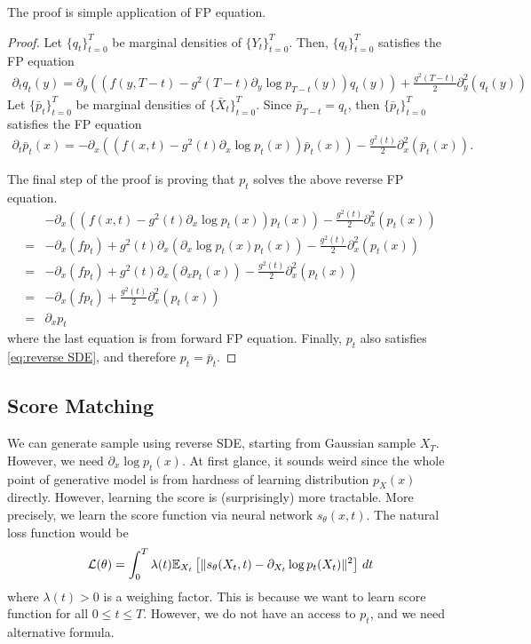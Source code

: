 \documentclass[11pt, a4paper]{article}
\begin{document}
The proof is simple application of FP equation.
\begin{proof}
    Let $\{q_t\}_{t=0}^T$ be marginal densities of $\{Y_t\}_{t=0}^T$.
    Then, $\{q_t\}_{t=0}^T$ satisfies the FP equation
    \begin{align}
        \partial_t q_t(y) = \partial_y \left((f(y, T-t) - g^2(T-t)\partial_y \log p_{T-t}(y))q_t(y)\right) + \frac{g^2(T-t)}{2} \partial_y^2(q_t(y))
    \end{align}
    Let $\{\bar{p}_t\}_{t=0}^T$ be marginal densities of $\{\bar{X}_t\}_{t=0}^T$.
    Since $\bar{p}_{T-t} = q_t$, then $\{\bar{p}_t\}_{t=0}^T$ satisfies the FP equation
    \begin{align}
        \partial_t \bar{p}_t(x) = -\partial_x \left((f(x, t) - g^2(t)\partial_x \log p_{t}(x))\bar{p}_t(x)\right) - \frac{g^2(t)}{2} \partial_x^2(\bar{p}_t(x)).
        \label{eq:reverse SDE}
    \end{align}

    The final step of the proof is proving that $p_t$ solves the above reverse FP equation.
    \begin{align}
        &-\partial_x \left((f(x, t) - g^2(t)\partial_x \log p_{t}(x))p_t(x)\right) - \frac{g^2(t)}{2} \partial_x^2(p_t(x))\\
        =& -\partial_x (fp_t) + g^2(t)\partial_x (\partial_x\log p_{t}(x)p_t(x)) - \frac{g^2(t)}{2} \partial_x^2(p_t(x))\\
        =& -\partial_x (fp_t) + g^2(t)\partial_x (\partial_x p_{t}(x)) - \frac{g^2(t)}{2} \partial_x^2(p_t(x))\\
        =&  -\partial_x (f p_t) + \frac{g^2(t)}{2}\partial_x^2 (p_t(x))\\
        =& \partial_x p_t
    \end{align}
    where the last equation is from forward FP equation.
    Finally, $p_t$ also satisfies \eqref{eq:reverse SDE}, and therefore $p_t = \bar{p}_t$.
\end{proof}

\subsection{Score Matching}
We can generate sample using reverse SDE, starting from Gaussian sample $X_T$.
However, we need $\partial_x \log p_t(x)$.
At first glance, it sounds weird since the whole point of generative model is from hardness of learning distribution $p_X(x)$ directly.
However, learning the score is (surprisingly) more tractable.
More precisely, we learn the score function via neural network $s_\theta(x, t)$.
The natural loss function would be
\begin{align}
    {\cal L}(\theta) = \int_0^T \lambda(t) \mathbb{E}_{X_t}\left[ \| s_\theta(X_t, t)  - \partial_{X_t} \log p_t(X_t)\|^2 \right]\, dt
\end{align}
where $\lambda(t)>0$ is a weighing factor.
This is because we want to learn score function for all $0\leq t\leq T$.
However, we do not have an access to $p_t$, and we need alternative formula.
\end{document}

